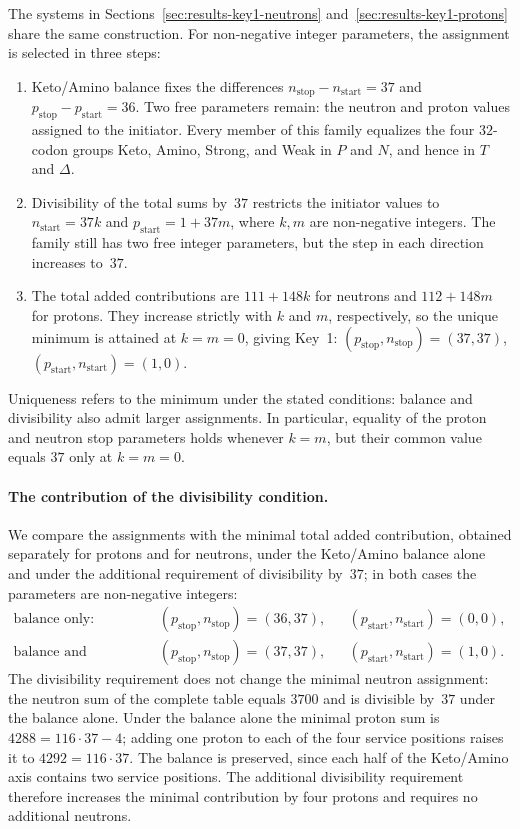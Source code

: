 \documentclass[11pt,a4paper]{article}
\renewcommand{\_}{\origunderscore\allowbreak}
\begin{document}
The systems in Sections~\ref{sec:results-key1-neutrons}
and~\ref{sec:results-key1-protons} share the same construction.
For non-negative integer parameters, the assignment is
selected in three steps:
\begin{enumerate}
\item Keto/Amino balance fixes the differences
$n_{\text{stop}}-n_{\text{start}}=37$ and
$p_{\text{stop}}-p_{\text{start}}=36$.
Two free parameters remain: the neutron and proton
values assigned to the initiator. Every member of this
family equalizes the four $32$-codon groups Keto, Amino,
Strong, and Weak in $P$ and $N$, and hence in $T$ and $\Delta$.
\item Divisibility of the total sums by~$37$ restricts
the initiator values to $n_{\text{start}}=37k$ and
$p_{\text{start}}=1+37m$, where $k,m$ are non-negative integers.
The family still has two free integer parameters, but
the step in each direction increases to~$37$.
\item The total added contributions are $111+148k$
for neutrons and $112+148m$ for protons. They increase
strictly with $k$ and $m$, respectively, so the unique
minimum is attained at $k=m=0$, giving Key~1:
$(p_{\text{stop}},n_{\text{stop}})=(37,37)$,
$(p_{\text{start}},n_{\text{start}})=(1,0)$.
\end{enumerate}
Uniqueness refers to the minimum under the stated conditions:
balance and divisibility also admit larger assignments.
In particular, equality of the proton and neutron stop
parameters holds whenever $k=m$, but their common value
equals $37$ only at $k=m=0$.

\paragraph{The contribution of the divisibility condition.}
We compare the assignments with the minimal total added
contribution, obtained separately for protons and for
neutrons, under the Keto/Amino balance alone and under the
additional requirement of divisibility by~$37$; in both
cases the parameters are non-negative integers:
\[
\begin{aligned}
\text{balance only:}\quad
&(p_{\text{stop}}, n_{\text{stop}}) = (36, 37), &
&(p_{\text{start}}, n_{\text{start}}) = (0, 0), \\
\text{balance and divisibility:}\quad
&(p_{\text{stop}}, n_{\text{stop}}) = (37, 37), &
&(p_{\text{start}}, n_{\text{start}}) = (1, 0).
\end{aligned}
\]
The divisibility requirement does not change the minimal
neutron assignment: the neutron sum of the complete table
equals $3700$ and is divisible by~$37$ under the balance
alone. Under the balance alone the minimal proton sum is
$4288 = 116 \cdot 37 - 4$; adding one proton to each of the
four service positions raises it to $4292 = 116 \cdot 37$.
The balance is preserved, since each half of the Keto/Amino
axis contains two service positions. The additional
divisibility requirement therefore increases the minimal
contribution by four protons and requires no additional
neutrons.
\end{document}

